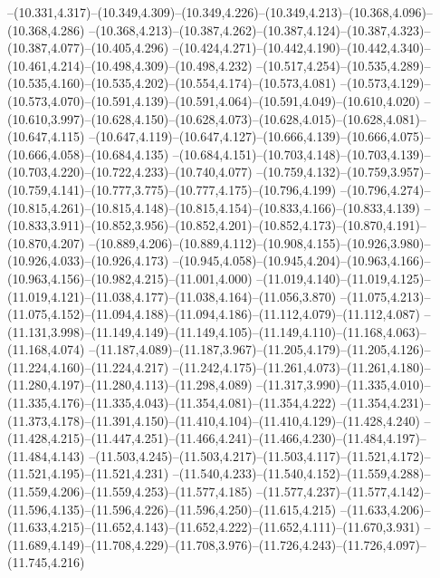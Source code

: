   --(10.331,4.317)--(10.349,4.309)--(10.349,4.226)--(10.349,4.213)--(10.368,4.096)--(10.368,4.286)%
  --(10.368,4.213)--(10.387,4.262)--(10.387,4.124)--(10.387,4.323)--(10.387,4.077)--(10.405,4.296)%
  --(10.424,4.271)--(10.442,4.190)--(10.442,4.340)--(10.461,4.214)--(10.498,4.309)--(10.498,4.232)%
  --(10.517,4.254)--(10.535,4.289)--(10.535,4.160)--(10.535,4.202)--(10.554,4.174)--(10.573,4.081)%
  --(10.573,4.129)--(10.573,4.070)--(10.591,4.139)--(10.591,4.064)--(10.591,4.049)--(10.610,4.020)%
  --(10.610,3.997)--(10.628,4.150)--(10.628,4.073)--(10.628,4.015)--(10.628,4.081)--(10.647,4.115)%
  --(10.647,4.119)--(10.647,4.127)--(10.666,4.139)--(10.666,4.075)--(10.666,4.058)--(10.684,4.135)%
  --(10.684,4.151)--(10.703,4.148)--(10.703,4.139)--(10.703,4.220)--(10.722,4.233)--(10.740,4.077)%
  --(10.759,4.132)--(10.759,3.957)--(10.759,4.141)--(10.777,3.775)--(10.777,4.175)--(10.796,4.199)%
  --(10.796,4.274)--(10.815,4.261)--(10.815,4.148)--(10.815,4.154)--(10.833,4.166)--(10.833,4.139)%
  --(10.833,3.911)--(10.852,3.956)--(10.852,4.201)--(10.852,4.173)--(10.870,4.191)--(10.870,4.207)%
  --(10.889,4.206)--(10.889,4.112)--(10.908,4.155)--(10.926,3.980)--(10.926,4.033)--(10.926,4.173)%
  --(10.945,4.058)--(10.945,4.204)--(10.963,4.166)--(10.963,4.156)--(10.982,4.215)--(11.001,4.000)%
  --(11.019,4.140)--(11.019,4.125)--(11.019,4.121)--(11.038,4.177)--(11.038,4.164)--(11.056,3.870)%
  --(11.075,4.213)--(11.075,4.152)--(11.094,4.188)--(11.094,4.186)--(11.112,4.079)--(11.112,4.087)%
  --(11.131,3.998)--(11.149,4.149)--(11.149,4.105)--(11.149,4.110)--(11.168,4.063)--(11.168,4.074)%
  --(11.187,4.089)--(11.187,3.967)--(11.205,4.179)--(11.205,4.126)--(11.224,4.160)--(11.224,4.217)%
  --(11.242,4.175)--(11.261,4.073)--(11.261,4.180)--(11.280,4.197)--(11.280,4.113)--(11.298,4.089)%
  --(11.317,3.990)--(11.335,4.010)--(11.335,4.176)--(11.335,4.043)--(11.354,4.081)--(11.354,4.222)%
  --(11.354,4.231)--(11.373,4.178)--(11.391,4.150)--(11.410,4.104)--(11.410,4.129)--(11.428,4.240)%
  --(11.428,4.215)--(11.447,4.251)--(11.466,4.241)--(11.466,4.230)--(11.484,4.197)--(11.484,4.143)%
  --(11.503,4.245)--(11.503,4.217)--(11.503,4.117)--(11.521,4.172)--(11.521,4.195)--(11.521,4.231)%
  --(11.540,4.233)--(11.540,4.152)--(11.559,4.288)--(11.559,4.206)--(11.559,4.253)--(11.577,4.185)%
  --(11.577,4.237)--(11.577,4.142)--(11.596,4.135)--(11.596,4.226)--(11.596,4.250)--(11.615,4.215)%
  --(11.633,4.206)--(11.633,4.215)--(11.652,4.143)--(11.652,4.222)--(11.652,4.111)--(11.670,3.931)%
  --(11.689,4.149)--(11.708,4.229)--(11.708,3.976)--(11.726,4.243)--(11.726,4.097)--(11.745,4.216)%

